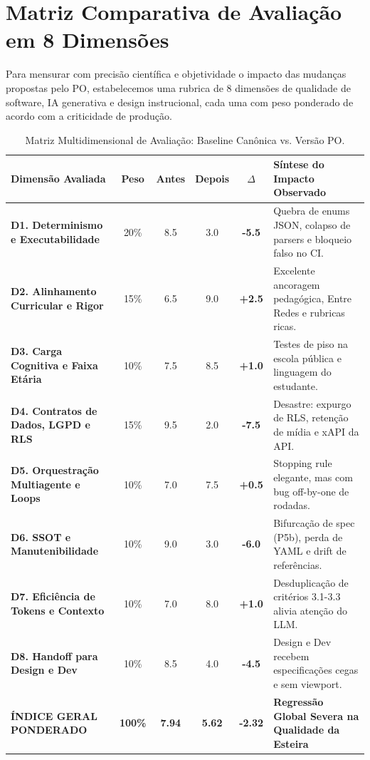 \documentclass[11pt,a4paper]{article}
\begin{document}
\section{Matriz Comparativa de Avaliação em 8 Dimensões}

Para mensurar com precisão científica e objetividade o impacto das mudanças propostas pelo PO, estabelecemos uma rubrica de 8 dimensões de qualidade de software, IA generativa e design instrucional, cada uma com peso ponderado de acordo com a criticidade de produção.

\begin{table}[htbp]
\centering
\small
\begin{tabularx}{\textwidth}{l c c c c >{\raggedright\arraybackslash}X}
\toprule
\textbf{Dimensão Avaliada} & \textbf{Peso} & \textbf{Antes} & \textbf{Depois} & \textbf{$\Delta$} & \textbf{Síntese do Impacto Observado} \\
\midrule
\textbf{D1. Determinismo e Executabilidade} & 20\% & 8.5 & 3.0 & \color{DarkRed}\textbf{-5.5} & Quebra de enums JSON, colapso de parsers e bloqueio falso no CI. \\
\textbf{D2. Alinhamento Curricular e Rigor} & 15\% & 6.5 & 9.0 & \color{DarkGreen}\textbf{+2.5} & Excelente ancoragem pedagógica, Entre Redes e rubricas ricas. \\
\textbf{D3. Carga Cognitiva e Faixa Etária} & 10\% & 7.5 & 8.5 & \color{DarkGreen}\textbf{+1.0} & Testes de piso na escola pública e linguagem do estudante. \\
\textbf{D4. Contratos de Dados, LGPD e RLS} & 15\% & 9.5 & 2.0 & \color{DarkRed}\textbf{-7.5} & Desastre: expurgo de RLS, retenção de mídia e xAPI da API. \\
\textbf{D5. Orquestração Multiagente e Loops} & 10\% & 7.0 & 7.5 & \color{DarkGreen}\textbf{+0.5} & Stopping rule elegante, mas com bug off-by-one de rodadas. \\
\textbf{D6. SSOT e Manutenibilidade} & 10\% & 9.0 & 3.0 & \color{DarkRed}\textbf{-6.0} & Bifurcação de spec (P5b), perda de YAML e drift de referências. \\
\textbf{D7. Eficiência de Tokens e Contexto} & 10\% & 7.0 & 8.0 & \color{DarkGreen}\textbf{+1.0} & Desduplicação de critérios 3.1-3.3 alivia atenção do LLM. \\
\textbf{D8. Handoff para Design e Dev} & 10\% & 8.5 & 4.0 & \color{DarkRed}\textbf{-4.5} & Design e Dev recebem especificações cegas e sem viewport. \\
\midrule
\textbf{ÍNDICE GERAL PONDERADO} & \textbf{100\%} & \textbf{7.94} & \textbf{5.62} & \color{DarkRed}\textbf{-2.32} & \textbf{Regressão Global Severa na Qualidade da Esteira} \\
\bottomrule
\end{tabularx}
\caption{Matriz Multidimensional de Avaliação: Baseline Canônica vs. Versão PO.}
\label{tab:matriz8d}
\end{table}
\end{document}
